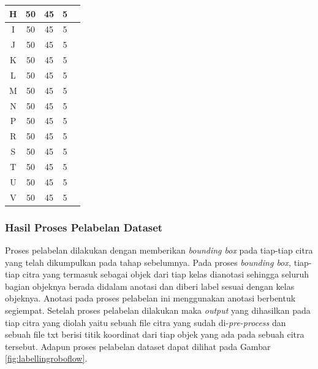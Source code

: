 \begin{center}
\begin{longtable}[c]{|c|c|c|c|c|}
  H             & 50           & 45           & 5           \\ \hline
  I             & 50           & 45           & 5           \\ \hline
  J             & 50           & 45           & 5           \\ \hline
  K             & 50           & 45           & 5           \\ \hline
  L             & 50           & 45           & 5           \\ \hline
  M             & 50           & 45           & 5           \\ \hline
  N             & 50           & 45           & 5           \\ \hline
  P             & 50           & 45           & 5           \\ \hline
  R             & 50           & 45           & 5           \\ \hline
  S             & 50           & 45           & 5           \\ \hline
  T             & 50           & 45           & 5           \\ \hline
  U             & 50           & 45           & 5           \\ \hline
  V             & 50           & 45           & 5           \\ \hline
  \end{longtable}
\end{center}
  
\subsubsection{Hasil Proses Pelabelan Dataset}
\label{subsubsec:hasilpelabelan}

Proses pelabelan dilakukan dengan memberikan \textit{bounding box} pada tiap-tiap citra yang telah dikumpulkan pada tahap sebelumnya. Pada proses \textit{bounding box,} tiap-tiap citra yang termasuk sebagai objek dari tiap kelas dianotasi sehingga seluruh bagian objeknya berada didalam anotasi dan diberi label sesuai dengan kelas objeknya. Anotasi pada proses pelabelan ini menggunakan anotasi berbentuk segiempat. Setelah proses pelabelan dilakukan maka \textit{output} yang dihasilkan pada tiap citra yang diolah yaitu sebuah file citra yang sudah di-\textit{pre-process} dan sebuah file txt berisi titik koordinat dari tiap objek yang ada pada sebuah citra tersebut. Adapun proses pelabelan dataset dapat dilihat pada Gambar \ref{fig:labellingroboflow}. 

